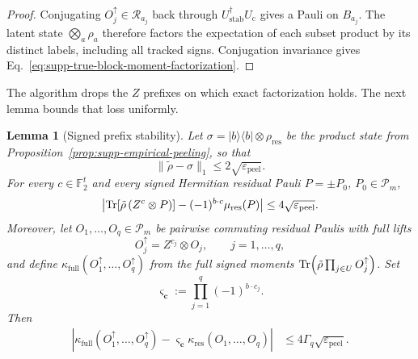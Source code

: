 \documentclass[
  aps,
  prx,
  reprint,
  superscriptaddress,
  amsmath,
  amssymb,
  nofootinbib,
  longbibliography
]{revtex4-2}
\newtheorem{lemma}[theorem]{Lemma}
\newcommand{\Pc}{\mathcal{P}}
\begin{document}
\begin{proof}
Conjugating $O_j^\uparrow\in\mathcal R_{a_j}$ back through
$U_{\mathrm{stab}}^\dagger U_{\mathrm c}$ gives a Pauli on $B_{a_j}$.
The latent state $\bigotimes_a\rho_a$ therefore factors the expectation of
each subset product by its distinct labels, including all tracked signs.
Conjugation invariance gives
Eq.~\eqref{eq:supp-true-block-moment-factorization}.
\end{proof}

The algorithm drops the $Z$ prefixes on which exact factorization holds.
The next lemma bounds that loss uniformly.

\begin{lemma}[Signed prefix stability]
\label{lem:supp-signed-prefix-stability}
Let $\sigma=|b\rangle\!\langle b|\otimes\rho_{\mathrm{res}}$ be the
product state from Proposition~\ref{prop:supp-empirical-peeling}, so that
\begin{equation}
\|\tilde\rho-\sigma\|_1\le 2\sqrt{\varepsilon_{\mathrm{peel}}}.
\end{equation}
For every $c\in\mathbb F_2^t$ and every signed Hermitian residual Pauli
$P=\pm P_0$, $P_0\in\Pc_m$,
\begin{equation}
\left|
\Tr\!\left[\tilde\rho\,(Z^c\otimes P)\right]
-
(-1)^{b\cdot c}
\mu_{\mathrm{res}}(P)
\right|
\le
4\sqrt{\varepsilon_{\mathrm{peel}}}.
\label{eq:supp-signed-prefix-stability}
\end{equation}
Moreover, let $O_1,\dots,O_q\in\Pc_m$ be pairwise commuting residual
Paulis with full lifts
\begin{equation}
O_j^\uparrow=Z^{c_j}\otimes O_j,
\qquad j=1,\dots,q,
\end{equation}
and define $\kappa_{\mathrm{full}}(O_1^\uparrow,\dots,O_q^\uparrow)$ from the full signed
moments $\Tr(\tilde\rho\prod_{j\in U}O_j^\uparrow)$.  Set
\begin{equation}
\varsigma_{\mathbf c}
:=
\prod_{j=1}^q(-1)^{b\cdot c_j}.
\end{equation}
Then
\begin{equation}
\begin{aligned}
\left|
\kappa_{\mathrm{full}}(O_1^\uparrow,\dots,O_q^\uparrow)
-
\varsigma_{\mathbf c}
\kappa_{\mathrm{res}}(O_1,\dots,O_q)
\right|
&\le
4\Gamma_q\sqrt{\varepsilon_{\mathrm{peel}}}.
\end{aligned}
\label{eq:supp-cumulant-prefix-stability}
\end{equation}
\end{lemma}
\end{document}
